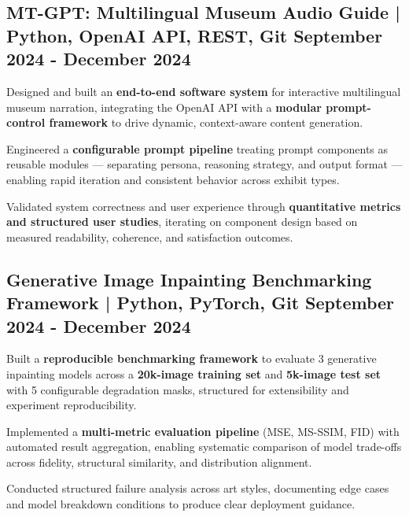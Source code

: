 
\subsection{{MT-GPT: Multilingual Museum Audio Guide | Python, OpenAI API, REST, Git \hfill September 2024 - December 2024}}
\begin{zitemize}
    \item Designed and built an \textbf{end-to-end software system} for interactive multilingual museum narration, integrating the OpenAI API with a \textbf{modular prompt-control framework} to drive dynamic, context-aware content generation.

    \item Engineered a \textbf{configurable prompt pipeline} treating prompt components as reusable modules — separating persona, reasoning strategy, and output format — enabling rapid iteration and consistent behavior across exhibit types.

    \item Validated system correctness and user experience through \textbf{quantitative metrics and structured user studies}, iterating on component design based on measured readability, coherence, and satisfaction outcomes.

\end{zitemize}


\subsection{{Generative Image Inpainting Benchmarking Framework | Python, PyTorch, Git \hfill September 2024 - December 2024}}
\begin{zitemize}
    \item Built a \textbf{reproducible benchmarking framework} to evaluate 3 generative inpainting models across a \textbf{20k-image training set} and \textbf{5k-image test set} with 5 configurable degradation masks, structured for extensibility and experiment reproducibility.

    \item Implemented a \textbf{multi-metric evaluation pipeline} (MSE, MS-SSIM, FID) with automated result aggregation, enabling systematic comparison of model trade-offs across fidelity, structural similarity, and distribution alignment.

    \item Conducted structured failure analysis across art styles, documenting edge cases and model breakdown conditions to produce clear deployment guidance.
\end{zitemize}





